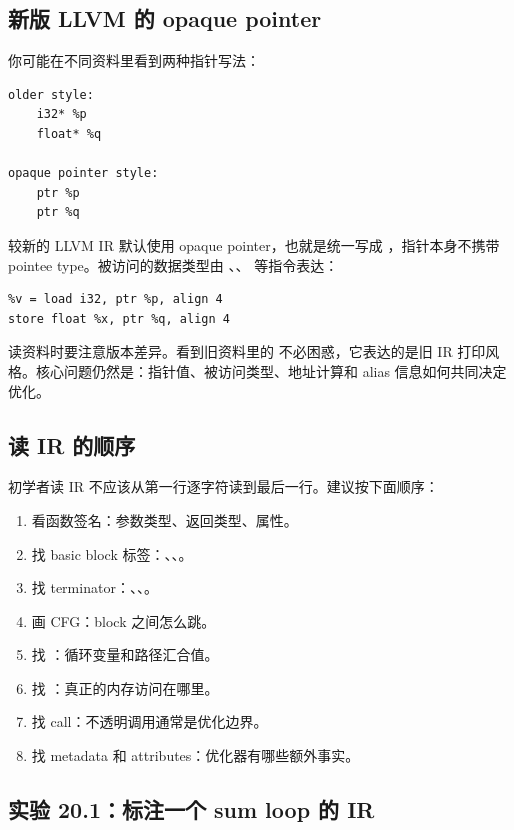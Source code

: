 \subsection{新版 LLVM 的 opaque pointer}

你可能在不同资料里看到两种指针写法：

\begin{lstlisting}
older style:
    i32* %p
    float* %q

opaque pointer style:
    ptr %p
    ptr %q
\end{lstlisting}

较新的 LLVM IR 默认使用 opaque pointer，也就是统一写成 ，指针本身不携带 pointee type。被访问的数据类型由 、、 等指令表达：

\begin{lstlisting}
%v = load i32, ptr %p, align 4
store float %x, ptr %q, align 4
\end{lstlisting}

读资料时要注意版本差异。看到旧资料里的  不必困惑，它表达的是旧 IR 打印风格。核心问题仍然是：指针值、被访问类型、地址计算和 alias 信息如何共同决定优化。

\subsection{读 IR 的顺序}

初学者读 IR 不应该从第一行逐字符读到最后一行。建议按下面顺序：

\begin{enumerate}
  \item 看函数签名：参数类型、返回类型、属性。
  \item 找 basic block 标签：、、。
  \item 找 terminator：、、。
  \item 画 CFG：block 之间怎么跳。
  \item 找 ：循环变量和路径汇合值。
  \item 找 ：真正的内存访问在哪里。
  \item 找 call：不透明调用通常是优化边界。
  \item 找 metadata 和 attributes：优化器有哪些额外事实。
\end{enumerate}

\subsection{实验 20.1：标注一个 sum loop 的 IR}

